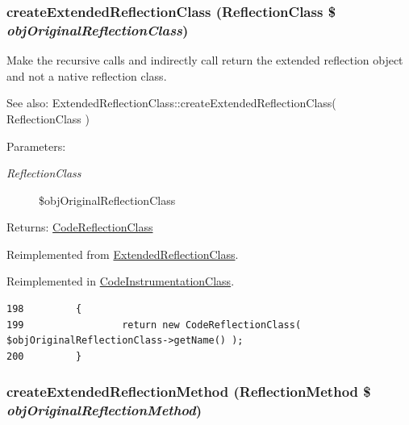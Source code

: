 \hypertarget{class_code_reflection_class_6b56ec198bc6a5b5a72076e4e7c19e29}{
\subsubsection[{createExtendedReflectionClass}]{\setlength{\rightskip}{0pt plus 5cm}createExtendedReflectionClass (ReflectionClass \$ {\em objOriginalReflectionClass})}}
\label{class_code_reflection_class_6b56ec198bc6a5b5a72076e4e7c19e29}


Make the recursive calls and indirectly call return the extended reflection object and not a native reflection class.

\begin{Desc}
\item[See also:]ExtendedReflectionClass::createExtendedReflectionClass( ReflectionClass ) \end{Desc}
\begin{Desc}
\item[Parameters:]
\begin{description}
\item[{\em ReflectionClass}]\$objOriginalReflectionClass \end{description}
\end{Desc}
\begin{Desc}
\item[Returns:]\hyperlink{class_code_reflection_class}{CodeReflectionClass} \end{Desc}


Reimplemented from \hyperlink{class_extended_reflection_class_6b56ec198bc6a5b5a72076e4e7c19e29}{ExtendedReflectionClass}.

Reimplemented in \hyperlink{class_code_instrumentation_class_6b56ec198bc6a5b5a72076e4e7c19e29}{CodeInstrumentationClass}.

\begin{Code}\begin{verbatim}198         {
199                 return new CodeReflectionClass( $objOriginalReflectionClass->getName() );
200         }
\end{verbatim}
\end{Code}


\hypertarget{class_code_reflection_class_ec7c1d4b204b6e3a6291d3b867afb688}{
\subsubsection[{createExtendedReflectionMethod}]{\setlength{\rightskip}{0pt plus 5cm}createExtendedReflectionMethod (ReflectionMethod \$ {\em objOriginalReflectionMethod})}}
\label{class_code_reflection_class_ec7c1d4b204b6e3a6291d3b867afb688}


